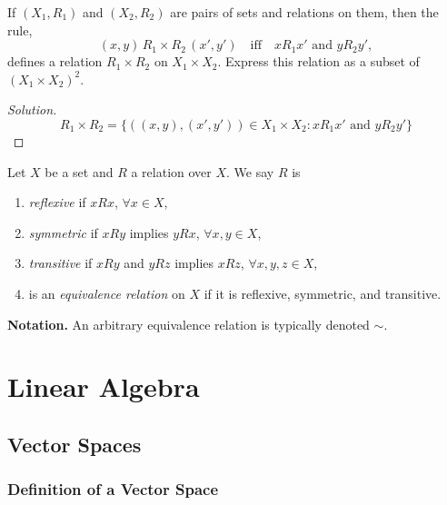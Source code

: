 \documentclass[12pt]{book}
\begin{document}
\begin{exercise}
If $(X_1, R_1)$ and $(X_2, R_2)$ are pairs of sets and relations on them, then the rule,
\[
(x,y) \, R_1 \times R_2 \, (x', y') \quad \text{iff} \quad xR_1x' \text{ and } yR_2y',
\]
defines a relation $R_1 \times R_2$ on $X_1 \times X_2$. Express this relation as a subset of $(X_1 \times X_2)^2$.
\end{exercise}

\begin{proof}[Solution]
    \[
        R_1 \times R_2 = \{ ((x,y),(x',y')) \in X_1 \times X_2 : xR_1x' \text{ and } yR_2y' \}
    \]
\end{proof}


\begin{definition}
     Let $X$ be a set and $R$ a relation over $X.$ We say $R$ is
     \begin{enumerate}
         \item \emph{reflexive} if $xRx$,  $\forall x \in X$,
         \item \emph{symmetric} if $xRy$ implies $yRx$,  $\forall x,y \in X$,
         \item \emph{transitive} if $xRy$ and $yRz$ implies $xRz$, $\forall x,y,z \in X$,
         \item is an \emph{equivalence relation} on $X$ if it is reflexive, symmetric, and transitive.
     \end{enumerate}
\end{definition}

\textbf{Notation.} An arbitrary equivalence relation is typically denoted $\sim$.














\chapter{Linear Algebra} 

\section{Vector Spaces}

\subsection{Definition of a Vector Space}
\end{document}
